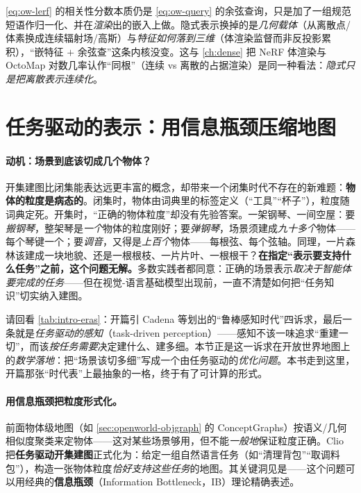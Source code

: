 \begin{insight}[隐式表示仍是同一内核的变体]
\cref{eq:ow-lerf} 的相关性分数本质仍是 \cref{eq:ow-query} 的余弦查询，只是加了一组规范短语作归一化、并在\emph{渲染}出的嵌入上做。隐式表示换掉的是\emph{几何载体}（从离散点/体素换成连续辐射场/高斯）与\emph{特征如何落到三维}（体渲染监督而非反投影累积），“嵌特征 $+$ 余弦查”这条内核没变。这与 \cref{ch:dense} 把 NeRF 体渲染与 OctoMap 对数几率认作“同根”（连续 vs 离散的占据渲染）是同一种看法：\emph{隐式只是把离散表示连续化}。
\end{insight}

\section{任务驱动的表示：用信息瓶颈压缩地图}
\label{sec:openworld-task}

\paragraph{动机：场景到底该切成几个物体？}
开集建图比闭集能表达远更丰富的概念，却带来一个闭集时代不存在的新难题：\textbf{物体的粒度是病态的}\cite{paull2026openworld}。闭集时，物体由词典里的标签定义（“工具”“杯子”），粒度随词典定死。开集时，“正确的物体粒度”却没有先验答案。一架钢琴、一间空屋：要\emph{搬钢琴}，整架琴是\emph{一个}物体的粒度刚好；要\emph{弹钢琴}，场景须建成\emph{九十多个}物体——每个琴键一个；要\emph{调音}，又得是\emph{上百个}物体——每根弦、每个弦轴。同理，一片森林该建成一块地貌、还是一根根枝、一片片叶、一根根干？\textbf{在指定“表示要支持什么任务”之前，这个问题无解。}多数实践者都同意：正确的场景表示\emph{取决于智能体要完成的任务}——但在视觉-语言基础模型出现前，一直不清楚如何把“任务知识”切实纳入建图。

\begin{insight}
请回看 \cref{tab:intro-eras}：开篇引 Cadena 等划出的“鲁棒感知时代”四诉求，最后一条就是\emph{任务驱动的感知}（task-driven perception）——感知不该一味追求“重建一切”，而该\emph{按任务需要}决定建什么、建多细。本节正是这一诉求在开放世界地图上的\emph{数学落地}：把“场景该切多细”写成一个由任务驱动的\emph{优化问题}。本书走到这里，开篇那张“时代表”上最抽象的一格，终于有了可计算的形式。
\end{insight}

\paragraph{用信息瓶颈把粒度形式化。}
前面物体级地图（如 \cref{sec:openworld-objgraph} 的 ConceptGraphs）按语义/几何相似度聚类来定物体——这对某些场景够用，但不能\emph{一般地}保证粒度正确。Clio\cite{maggio2024clio} 把\textbf{任务驱动开集建图}正式化为：给定一组自然语言任务（如“清理背包”“取调料包”），构造一张物体粒度\emph{恰好支持这些任务}的地图。其关键洞见是——这个问题可以用经典的\textbf{信息瓶颈}（Information Bottleneck，IB）理论\cite{tishby1999ib}精确表述。

